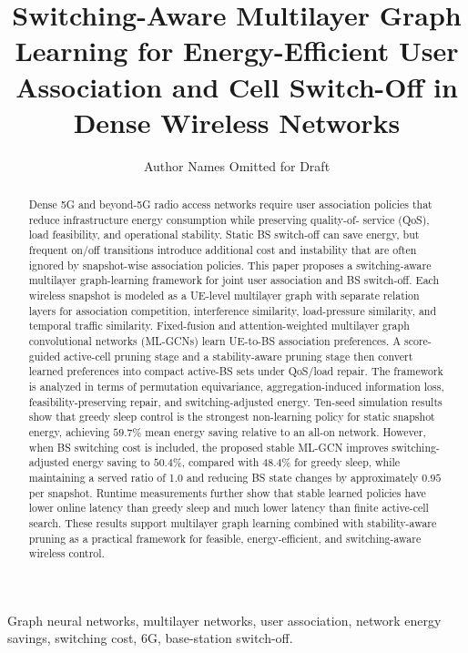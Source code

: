 \documentclass[journal]{IEEEtran}
\title{Switching-Aware Multilayer Graph Learning for Energy-Efficient User Association and Cell Switch-Off in Dense Wireless Networks}
\author{Author Names Omitted for Draft}
\begin{document}
\maketitle

\begin{abstract}
Dense 5G and beyond-5G radio access networks require user association policies
that reduce infrastructure energy consumption while preserving quality-of-
service (QoS), load feasibility, and operational stability. Static BS
switch-off can save energy, but frequent on/off transitions introduce
additional cost and instability that are often ignored by snapshot-wise
association policies. This paper proposes a switching-aware multilayer
graph-learning framework for joint user association and BS switch-off. Each
wireless snapshot is modeled as a UE-level multilayer graph with separate
relation layers for association competition, interference similarity,
load-pressure similarity, and temporal traffic similarity. Fixed-fusion and
attention-weighted multilayer graph convolutional networks (ML-GCNs) learn
UE-to-BS association preferences. A score-guided active-cell pruning stage and
a stability-aware pruning stage then convert learned preferences into compact
active-BS sets under QoS/load repair. The framework is analyzed in terms of
permutation equivariance, aggregation-induced information loss,
feasibility-preserving repair, and switching-adjusted energy. Ten-seed
simulation results show that greedy sleep control is the strongest
non-learning policy for static snapshot energy, achieving $59.7\%$ mean energy
saving relative to an all-on network. However, when BS switching cost is
included, the proposed stable ML-GCN improves switching-adjusted energy saving
to $50.4\%$, compared with $48.4\%$ for greedy sleep, while maintaining a
served ratio of 1.0 and reducing BS state changes by approximately $0.95$ per
snapshot. Runtime measurements further show that stable learned policies have
lower online latency than greedy sleep and much lower latency than finite
active-cell search. These results support multilayer graph learning combined
with stability-aware pruning as a practical framework for feasible,
energy-efficient, and switching-aware wireless control.
\end{abstract}

\begin{IEEEkeywords}
Graph neural networks, multilayer networks, user association, network energy
savings, switching cost, 6G, base-station switch-off.
\end{IEEEkeywords}
\end{document}

